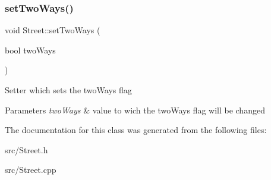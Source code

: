 \subsubsection{\texorpdfstring{set\+Two\+Ways()}{setTwoWays()}}
{\footnotesize\ttfamily void Street\+::set\+Two\+Ways (\begin{DoxyParamCaption}\item[{bool}]{two\+Ways }\end{DoxyParamCaption})}

Setter which sets the two\+Ways flag 
\begin{DoxyParams}{Parameters}
{\em two\+Ways} & value to wich the two\+Ways flag will be changed \\
\hline
\end{DoxyParams}


The documentation for this class was generated from the following files\+:\begin{DoxyCompactItemize}
\item 
src/Street.\+h\item 
src/Street.\+cpp\end{DoxyCompactItemize}
